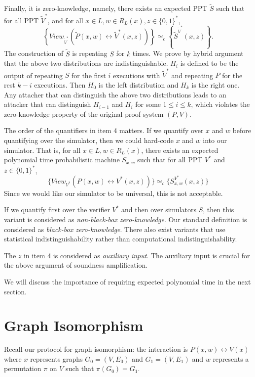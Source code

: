 Finally, it  is zero-knowledge, namely, there exists an expected PPT $\tilde S$ such that for all PPT $\tilde V^*$, and for all $x \in L, w \in R_L (x), z \in \{ 0, 1 \}^*$,
$$\left\{ View_{\tilde V^*} (\tilde P(x,w) \leftrightarrow \tilde V^* (x,z)) \right\} \simeq_c \left\{ \tilde S^{\tilde V^*} (x,z) \right\}.$$
The construction of $\tilde S$ is repeating $S$ for $k$ times. We prove by hybrid argument that the above two distributions are indistinguishable. $H_i$ is defined to be the output of repeating $S$ for the first $i$ executions with $\tilde V^*$ and repeating $P$ for the rest $k-i$ executions. Then $H_0$ is the left distribution and $H_k$ is the right one. Any attacher that can distinguish the above two distributions leads to an attacker that can distinguish $H_{i-1}$ and $H_{i}$ for some $1\leq i \leq k$, which violates the zero-knowledge property of the original proof system $(P,V)$.


\bigskip
The order of the quantifiers in item 4 matters.
If we quantify over $x$ and $w$ before quantifying over the simulator,
then we could hard-code  $x$ and $w$ into our simulator. That is, for all $x \in L, w \in R_L (x)$, there exists an expected polynomial time probabilistic machine $S_{x,w}$ such that for all PPT $V^*$ and $z \in \{ 0, 1 \}^*$,
$$\{ View_{V^*} (P(x,w) \leftrightarrow V^* (x,z)) \} \simeq_c \{ S_{x,w}^{V^*} (x,z) \} $$
Since we would like our simulator to be universal,  this is not acceptable.

If we quantify first over the verifier $V^*$ and then over simulators $S$, then this variant is considered as \emph{non-black-box zero-knowledge}. Our standard definition is considered as \emph{black-box zero-knowledge}. There  also exist variants that use statistical indistinguishability rather than computational indistinguishability.

The $z$ in item 4 is considered as \emph{auxiliary input}. The auxiliary input is crucial for the above argument of soundness amplification.

We will discuss the importance of requiring expected polynomial time in the next section.

\section{Graph Isomorphism}

Recall our protocol for graph isomorphism: the interaction is $P(x,w) \leftrightarrow V(x)$ where $x$ represents graphs $G_0 = (V, E_0)$ and $G_1 = (V, E_1)$ and $w$ represents a permutation $\pi$ on $V$ such that $\pi (G_0) = G_1$.

